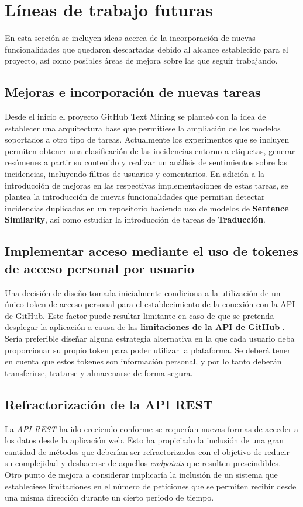 \section{Líneas de trabajo futuras}

En esta sección se incluyen ideas acerca de la incorporación de nuevas funcionalidades que quedaron descartadas debido al alcance establecido para el proyecto, así como posibles áreas de mejora sobre las que seguir trabajando.

\subsection{Mejoras e incorporación de nuevas tareas}

Desde el inicio el proyecto GitHub Text Mining se planteó con la idea de establecer una arquitectura base que permitiese la ampliación de los modelos soportados a otro tipo de tareas. Actualmente los experimentos que se incluyen permiten obtener una clasificación de las incidencias entorno a etiquetas, generar resúmenes a partir su contenido y realizar un análisis de sentimientos sobre las incidencias, incluyendo filtros de usuarios y comentarios. En adición a la introducción de mejoras en las respectivas implementaciones de estas tareas, se plantea la introducción de nuevas funcionalidades que permitan detectar incidencias duplicadas en un repositorio haciendo uso de modelos de \textbf{Sentence Similarity}, así como estudiar la introducción de tareas de \textbf{Traducción}.

\subsection{Implementar acceso mediante el uso de tokenes de acceso personal por usuario}

Una decisión de diseño tomada inicialmente condiciona a la utilización de un único token de acceso personal para el establecimiento de la conexión con la API de GitHub. Este factor puede resultar limitante en caso de que se pretenda desplegar la aplicación a causa de las \textbf{limitaciones de la API de GitHub} \cite{lf:github_api_limits}. Sería preferible diseñar alguna estrategia alternativa en la que cada usuario deba proporcionar su propio token para poder utilizar la plataforma. Se deberá tener en cuenta que estos tokenes son información personal, y por lo tanto deberán transferirse, tratarse y almacenarse de forma segura.

\subsection{Refractorización de la API REST}

La \emph{API REST} ha ido creciendo conforme se requerían nuevas formas de acceder a los datos desde la aplicación web. Esto ha propiciado la inclusión de una gran cantidad de métodos que deberían ser refractorizados con el objetivo de reducir su complejidad y deshacerse de aquellos \emph{endpoints} que resulten prescindibles. Otro punto de mejora a considerar implicaría la inclusión de un sistema que estableciese limitaciones en el número de peticiones que se permiten recibir desde una misma dirección durante un cierto periodo de tiempo.
